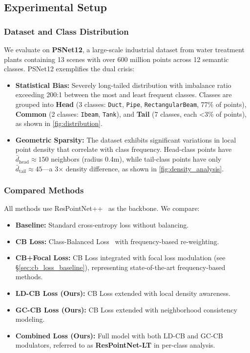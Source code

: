 \documentclass[preprint,12pt]{elsarticle}
\begin{document}
\subsection{Experimental Setup}
\label{sec:exp_setup}

\subsubsection{Dataset and Class Distribution}
We evaluate on \textbf{PSNet12}, a large-scale industrial dataset from water treatment plants containing 13 scenes with over 600 million points across 12 semantic classes. PSNet12 exemplifies the dual crisis:
\begin{itemize}
    \item \textbf{Statistical Bias:} Severely long-tailed distribution with imbalance ratio exceeding 200:1 between the most and least frequent classes. Classes are grouped into \textbf{Head} (3 classes: \texttt{Duct}, \texttt{Pipe}, \texttt{RectangularBeam}, 77\% of points), \textbf{Common} (2 classes: \texttt{Ibeam}, \texttt{Tank}), and \textbf{Tail} (7 classes, each <3\% of points), as shown in \autoref{fig:distribution}.
    \item \textbf{Geometric Sparsity:} The dataset exhibits significant variations in local point density that correlate with class frequency. Head-class points have $\bar{d}_{\text{head}} \approx 150$ neighbors (radius 0.4m), while tail-class points have only $\bar{d}_{\text{tail}} \approx 45$—a 3× density difference, as shown in \autoref{fig:density_analysis}.
\end{itemize}

\subsubsection{Compared Methods}
All methods use ResPointNet++~\cite{respointnet} as the backbone. We compare:
\begin{itemize}
    \item \textbf{Baseline:} Standard cross-entropy loss without balancing.
    \item \textbf{CB Loss:} Class-Balanced Loss~\cite{cui2019class} with frequency-based re-weighting.
    \item \textbf{CB+Focal Loss:} CB Loss integrated with focal loss modulation (see \S\ref{sec:cb_loss_baseline}), representing state-of-the-art frequency-based methods.
    \item \textbf{LD-CB Loss (Ours):} CB Loss extended with local density awareness.
    \item \textbf{GC-CB Loss (Ours):} CB Loss extended with neighborhood consistency modeling.
    \item \textbf{Combined Loss (Ours):} Full model with both LD-CB and GC-CB modulators, referred to as \textbf{ResPointNet-LT} in per-class analysis.
\end{itemize}
\end{document}

